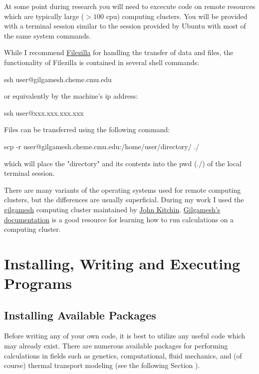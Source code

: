 At some point during research you will need to excecute code on remote 
resources which are typically large ($> 100$ cpu) computing clusters. 
You will be provided with a terminal session similar to the session 
provided by Ubuntu with most of the same system commands. 

While I recommend 
\href{https://filezilla-project.org/}{Filezilla} 
for handling the transfer of data and files, 
the functionality of Filezilla is contained in several shell 
commands:

ssh user@gilgamesh.cheme.cmu.edu

or equivalently by the machine's ip address:

ssh user@xxx.xxx.xxx.xxx

Files can be transferred using the following command:

scp -r user@gilgamesh.cheme.cmu.edu:/home/user/directory/ ./

which will place the "directory" and its contents into the pwd (./) 
of the local terminal session. 

There are many variants of the operating systems used for remote 
computing clusters, but the differences are usually superficial. 
During my work I used the 
\href{http://gilgamesh.cheme.cmu.edu/doc/gilgamesh.html}
{gilgamesh} computing cluster maintained by 
\href{https://github.com/jkitchin}{John Kitchin}. 
\href{http://gilgamesh.cheme.cmu.edu/doc/gilgamesh.html}
{Gilgamesh's documentation} is a good resource for learning how to run 
calculations on a computing cluster.

\section{\label{A:Comp_Env:Programs}
Installing, Writing and Executing Programs}

\subsection{\label{A:Comp_Env:Install}Installing Available Packages}

Before writing any of your own code, it is best to utilize any useful 
code which may already exist. There are numerous available packages 
for performing calculations in fields such as genetics, computational, 
fluid mechanics, and (of course) thermal transport modeling (see the 
following Section ). 


